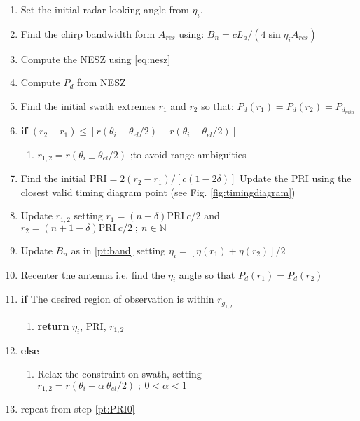 \documentclass[conference,a4paper]{IEEEtran}
\begin{document}
    \begin{enumerate}
        \item Set the initial radar looking angle from $\eta_i$.
        \item \label{pt:band}Find the chirp bandwidth form $A_{res}$ using: $B_n = c L_a / (4 \sin{\eta_i} A_{res} )$
        \item Compute the NESZ using \eqref{eq:nesz}
        \item Compute $P_d$ from NESZ
        \item \label{pt:swath1}Find the initial swath extremes $r_{1}$ and $r_{2}$ so that: $P_d(r_1) = P_d(r_2) = P_{d_{min}}$
        \item \label{pt:swath2} \textbf{if} {$(r_2 - r_1) \leq \left[r(\theta_i + \theta_{el}/2) - r(\theta_i - \theta_{el}/2) \right]$}
        \begin{enumerate}
            \item $r_{1,2} = r(\theta_i \pm \theta_{el}/2)$ ;to avoid range ambiguities
        \end{enumerate}
        \item \label{pt:PRI0}Find the initial $\text{PRI} = 2(r_2 - r_1) / \left[c (1-2\delta)\right]$
        \label{pt:timingconstraint} Update the PRI using the closest valid timing diagram point (see Fig. \ref{fig:timingdiagram})
        \item Update $r_{1,2}$ setting $r_{1} = (n + \delta)\text{PRI}\ c / 2 $  and\\ $r_2 = (n + 1 - \delta)\text{PRI}\ c / 2\; ;\ n\in \mathbb{N}$
        \item Update $ B_n $ as in \ref{pt:band} setting $\eta_i = [\eta(r_1) + \eta(r_2)] / 2$
        \item Recenter the antenna i.e. find the $\eta_i$ angle so that $P_d(r_1) = P_d(r_2)$
        \item \textbf{if} {The desired region of observation is within $r_{g_{1,2}}$}
        \begin{enumerate}
            \item \textbf{return} $\eta_i$, PRI, $r_{1,2}$
        \end{enumerate}
        \item \textbf{else}
        \begin{enumerate}
            \item \label{pt:relaxed}Relax the constraint on swath, setting \\$r_{1,2} = r(\theta_i \pm \alpha\ \theta_{el}/2)\; ;\ 0< \alpha < 1 $
        \end{enumerate}
        \item repeat from step \ref{pt:PRI0}
    \end{enumerate}
\end{document}

